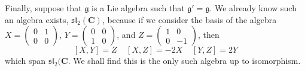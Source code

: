 Finally, suppose that $\mathfrak{g}$ is a Lie algebra such that $\mathfrak{g}' = \mathfrak{g}$. We already know such an algebra exists, $\mathfrak{sl}_2(\mathbf{C})$, because if we consider the basis of the algebra $X = \left( \begin{smallmatrix} 0 & 1 \\ 0 & 0 \end{smallmatrix} \right)$, $Y = \left( \begin{smallmatrix} 0 & 0 \\ 1 & 0 \end{smallmatrix} \right)$, and $Z = \left( \begin{smallmatrix} 1 & 0 \\ 0 & -1 \end{smallmatrix} \right)$, then
%
\[ [X,Y] = Z\ \ \ \ \ [X,Z] = -2X\ \ \ \ \ [Y,Z] = 2Y \]
%
which span $\mathfrak{sl}_2(\mathbf{C}$. We shall find this is the only such algebra up to isomorphism.

